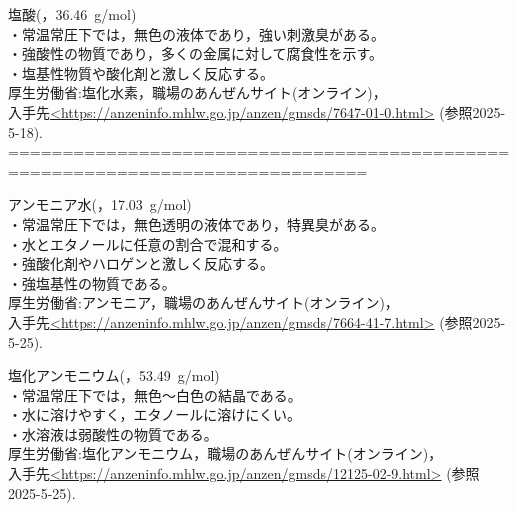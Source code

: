 \item 塩酸(，36.46\ g/mol)\cite{4}\\
                    \hspace{0pt}・常温常圧下では，無色の液体であり，強い刺激臭がある。\\
                    \hspace{0pt}・強酸性の物質であり，多くの金属に対して腐食性を示す。\\
                    \hspace{0pt}・塩基性物質や酸化剤と激しく反応する。\\
  厚生労働省:塩化水素，職場のあんぜんサイト(オンライン)，\\
                         入手先\url{<https://anzeninfo.mhlw.go.jp/anzen/gmsds/7647-01-0.html>}
                         (参照2025-5-18).
===============================================================================
\item アンモニア水(，17.03\ g/mol)\cite{7}\\
                    \hspace{0pt}・常温常圧下では，無色透明の液体であり，特異臭がある。\\
                    \hspace{0pt}・水とエタノールに任意の割合で混和する。\\
                    \hspace{0pt}・強酸化剤やハロゲンと激しく反応する。\\
                    \hspace{0pt}・強塩基性の物質である。\\
  厚生労働省:アンモニア，職場のあんぜんサイト(オンライン)，\\
                         入手先\url{<https://anzeninfo.mhlw.go.jp/anzen/gmsds/7664-41-7.html>}
                         (参照2025-5-25).


\item 塩化アンモニウム(，53.49\ g/mol)\cite{8}\\
                    \hspace{0pt}・常温常圧下では，無色〜白色の結晶である。\\
                    \hspace{0pt}・水に溶けやすく，エタノールに溶けにくい。\\
                    \hspace{0pt}・水溶液は弱酸性の物質である。\\
  厚生労働省:塩化アンモニウム，職場のあんぜんサイト(オンライン)，\\
                         入手先\url{<https://anzeninfo.mhlw.go.jp/anzen/gmsds/12125-02-9.html>}
                         (参照2025-5-25).  

























